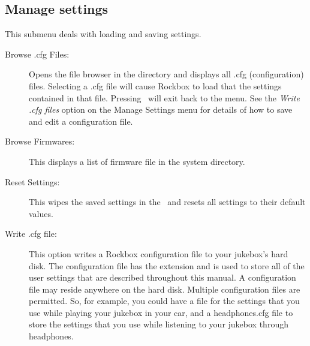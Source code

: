 \subsection{\label{sec:manage_settings}Manage settings}
This submenu deals with loading and saving settings. 
%
  \begin{description}
    \item [Browse .cfg Files: ]Opens the file browser in the 
     directory and displays all .cfg (configuration) files.
    Selecting a .cfg file will cause Rockbox to load that the settings
    contained in that file. Pressing \ButtonLeft\ will exit back to the menu. 
    See the \emph{Write .cfg files} option on the Manage Settings menu for
    details of how to save and edit a configuration file.
    \item [Browse Firmwares: ]This displays a list of firmware file in
    the  system directory. %
    \item [Reset Settings: ]This wipes the saved settings in the \dap\ and
    resets all settings to their default values. 
    \item [Write .cfg file: ]This option writes a Rockbox configuration file
    to your jukebox's hard disk. The configuration file has the 
    extension and is used to store all of the user settings that are described
    throughout this manual.
    A configuration file may reside anywhere on the hard disk. Multiple
    configuration files are permitted. So, for example, you could have 
    a  file for the settings that you use while playing your
    jukebox in your car, and a headphones.cfg file to store the settings that
    you use while listening to your jukebox through headphones.


\end{description}
